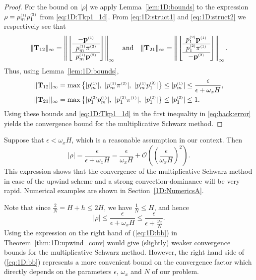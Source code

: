 \begin{proof}
For the bound on $|\rho|$ we apply Lemma~\ref{lem:1D:bounds} to the expression
$\rho=p^{\scriptscriptstyle (1)}_m p^{\scriptscriptstyle (2)}_1$ from \eqref{eq:1D:Tkp1_1d}.
%
From \eqref{eq:1D:struct1} and \eqref{eq:1D:struct2} we respectively see that
%
\begin{align*}
\|\mathbf{T}_{12}\|_\infty = \left\|\left[\begin{array}{c}
-\mathbf{p}^{\scriptscriptstyle (1)}\\
\hline
p^{\scriptscriptstyle (1)}_m\pi^{\scriptscriptstyle (2)}\\
\hline
p^{\scriptscriptstyle (1)}_m \mathbf{p}^{\scriptscriptstyle (2)}
\end{array}\right]\right\|_\infty
\quad\mbox{and}\quad
\|\mathbf{T}_{21}\|_\infty = \left\|\left[\begin{array}{c}
p^{\scriptscriptstyle (2)}_1 \mathbf{p}^{\scriptscriptstyle (1)}\\
\hline
p^{\scriptscriptstyle (2)}_1\pi^{\scriptscriptstyle (1)}\\
\hline
-\mathbf{p}^{\scriptscriptstyle (2)}\end{array}\right]\right\|_\infty.
\end{align*}
%
Thus, using Lemma~\ref{lem:1D:bounds},
%
\begin{align*}
\| \T_{12} \|_\infty &= \max\left\{|p^{\klein{(1)}}_m|, \ |p^{\klein{(1)}}_m \piTwo|,\ |p^{\klein{(1)}}_m p^{\klein{(2)}}_1|\right\} \leq |p^{\klein{(1)}}_m|\leq \frac{\epsilon}{\epsilon+\omega_x H},\\
\| \T_{21} \|_\infty &= \max\left\{|p^{\klein{(2)}}_1 p^{\klein{(1)}}_m|, \ |p^{\klein{(2)}}_1 \piOne|,\ | p^{\klein{(2)}}_1|\right\}
\leq | p^{\klein{(2)}}_1|\leq 1.
\end{align*}
%
Using these bounds and \eqref{eq:1D:Tkp1_1d} in the first inequality in
\eqref{eq:back:error} yields the convergence bound for the multiplicative
Schwarz method.
\end{proof}

Suppose that $\epsilon < \omega_x H$, which is a reasonable assumption in our
context. Then
%
$$|\rho|=\frac{\epsilon}{\epsilon+\omega_x H} = \frac{\epsilon}{\omega_x H}
+ \mathscr{O}\left(\left(\frac{\epsilon}{\omega_x H}\right)^2\right).$$
%
This expression shows that the convergence of the multiplicative Schwarz
method in case of the upwind scheme and a strong convection-dominance will be
very rapid. Numerical examples are shown in Section~\ref{1D:NumericsA}.

Note that since $\frac{2}{N} = H+h \leq 2H$, we have $\frac{1}{N} \leq H$,
and hence
\begin{equation}\label{eq:1D:bb}
|\rho|\leq \frac{\epsilon}{\epsilon + \omega_x H} \leq \frac{\epsilon}{\epsilon + \frac{\omega_x}{N}}.
\end{equation}
Using the expression on the right hand of (\ref{eq:1D:bb}) in
Theorem~\ref{thm:1D:upwind_conv} would give (slightly) weaker convergence bounds
for the multiplicative Schwarz method. However, the right hand side of
(\ref{eq:1D:bb}) represents a more convenient bound on the convergence factor
which directly depends on the parameters $\epsilon$, $\omega_x$ and $N$ of our
problem.

